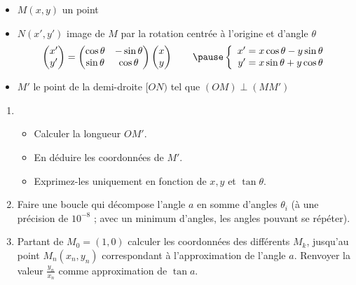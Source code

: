 \begin{frame}
\vspace*{-4ex}
\pause
\begin{itemize}
  \item $M(x,y)$ un point
\pause
  \item $N(x',y')$ image de $M$ par la rotation centrée à l'origine et d'angle $\theta$
\pause
 $$\begin{pmatrix} x' \\ y' \end{pmatrix}
= \begin{pmatrix} \cos \theta & - \sin \theta \\ \sin \theta & \cos \theta \end{pmatrix}
\begin{pmatrix} x \\y \end{pmatrix}
\qquad
\pause
\left\{ \begin{array}{rcl} 
        x' = x \cos \theta - y \sin \theta \\
        y' = x \sin \theta + y \cos \theta \\
        \end{array}
\right. $$
\pause
  \item $M'$ le point de la demi-droite $[ON)$ tel que  $(OM)\perp(MM')$ 
\end{itemize}
\end{frame}


\begin{frame}

\vspace*{-2ex}
\begin{tp}
\begin{enumerate}
  \item
  \begin{itemize}
    \item Calculer la longueur $OM'$. 
    \item En déduire les coordonnées de $M'$. 
    \item Exprimez-les uniquement en fonction de $x,y$ et $\tan \theta$.
  \end{itemize}
  
  \item Faire une boucle qui décompose l'angle $a$ en somme d'angles $\theta_i$ (à une précision de $10^{-8}$ ; 
  avec un minimum d'angles, les angles pouvant se répéter).
  
  \item Partant de $M_0 = (1,0)$ calculer les coordonnées des différents $M_k$, 
  jusqu'au point $M_n(x_n,y_n)$ correspondant à l'approximation de l'angle $a$. 
  Renvoyer la valeur $\frac{y_n}{x_n}$ comme approximation de $\tan a$.
\end{enumerate}  
\end{tp}
\end{frame}


